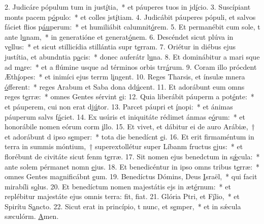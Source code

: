 2. Judicáre pópulum tum in just\uline{í}tia,~* et páuperes tuos in jd\uline{í}cio.
3. Suscípiant monts pacem p\uline{ó}pulo:~* et colles jst\uline{í}tiam.
4. Judicábit páuperes pópuli, et salvos fáciet flios p\uline{áu}perum:~* et humiliábit calumnit\uline{ó}rem.
5. Et permanébit cum sole, t ante l\uline{u}nam,~* in generatióne et generat\uline{ó}nem.
6. Descéndet sicut plúva in v\uline{e}llus:~* et sicut stillicídia stillántia supr t\uline{e}rram.
7. Oriétur in diébus ejus justítia, et abundntia p\uline{a}cis:~* donec auferátr l\uline{u}na.
8. Et dominábitur a mari sque ad m\uline{a}re:~* et a flúmine usque ad términos orbis trr\uline{á}rum.
9. Coram illo prócdent Æth\uline{í}opes:~* et inimíci ejus terrm l\uline{i}ngent.
10. Reges Tharsis, et ínsulæ mnera \uline{ó}fferent:~* reges Arabum et Saba dona dd\uline{ú}cent.
11. Et adorábunt eum omns reges t\uline{e}rræ:~* omnes Gentes sérvint \uline{e}i:
12. Quia liberábit páuperm a pot\uline{é}nte:~* et páuperem, cui non erat dj\uline{ú}tor.
13. Parcet páupri et \uline{í}nopi:~* et ánimas páuperum salvs f\uline{á}ciet.
14. Ex usúris et iniquitáte rédimet ánmas e\uline{ó}rum:~* et honorábile nomen eórum corm \uline{i}llo.
15. Et vivet, et dábitur ei de auro Arábiæ,~† et adorábunt d ipso s\uline{e}mper:~* tota die benedícnt \uline{e}i.
16. Et erit firmaméntum in terra in summis móntium,~† superextollétur super Líbanm fructus \uline{e}jus:~* et florébunt de civitáte sicut fenm t\uline{e}rræ.
17. Sit nomen ejus benedctum in s\uline{ǽ}cula:~* ante solem pérmanet nomn \uline{e}jus.
18. Et benedicéntur in ipso omns tribus t\uline{e}rræ:~* omnes Gentes magnificábnt \uline{e}um.
19. Benedíctus Dómins, Deus \uline{I}sraël,~* qui facit mirabíli s\uline{o}lus.
20. Et benedíctum nomen majestátis ejs in æt\uline{é}rnum:~* et replébitur majestáte ejus omnis terra: fit, f\uline{i}at.
21. Glória Ptri, et F\uline{í}lio,~* et Spirítu S\uline{a}ncto.
22. Sicut erat in princípio, t nunc, et s\uline{e}mper,~* et in sǽcula sæculórm. \uline{A}men.
